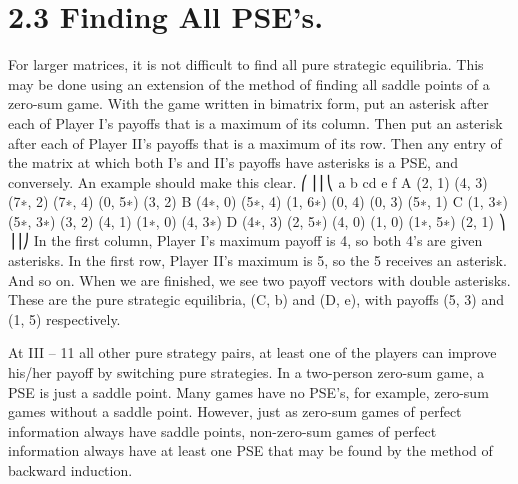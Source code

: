 \documentclass{article}
\begin{document}

\section{2.3 Finding All PSE’s.} For larger matrices, it is not difficult to find all pure strategic
equilibria. This may be done using an extension of the method of finding all saddle points
of a zero-sum game. With the game written in bimatrix form, put an asterisk after each
of Player I’s payoffs that is a maximum of its column. Then put an asterisk after each of
Player II’s payoffs that is a maximum of its row. Then any entry of the matrix at which
both I’s and II’s payoffs have asterisks is a PSE, and conversely.
An example should make this clear.
⎛
⎜⎜⎝
a b cd e f
A (2, 1) (4, 3) (7∗, 2) (7∗, 4) (0, 5∗) (3, 2)
B (4∗, 0) (5∗, 4) (1, 6∗) (0, 4) (0, 3) (5∗, 1)
C (1, 3∗) (5∗, 3∗) (3, 2) (4, 1) (1∗, 0) (4, 3∗)
D (4∗, 3) (2, 5∗) (4, 0) (1, 0) (1∗, 5∗) (2, 1)
⎞
⎟⎟⎠
In the first column, Player I’s maximum payoff is 4, so both 4’s are given asterisks. In the
first row, Player II’s maximum is 5, so the 5 receives an asterisk. And so on.
When we are finished, we see two payoff vectors with double asterisks. These are the
pure strategic equilibria, (C, b) and (D, e), with payoffs (5, 3) and (1, 5) respectively. 

At
III – 11
all other pure strategy pairs, at least one of the players can improve his/her payoff by
switching pure strategies.
In a two-person zero-sum game, a PSE is just a saddle point. Many games have no
PSE’s, for example, zero-sum games without a saddle point. However, just as zero-sum
games of perfect information always have saddle points, non-zero-sum games of perfect
information always have at least one PSE that may be found by the method of backward
induction.
\end{document}
